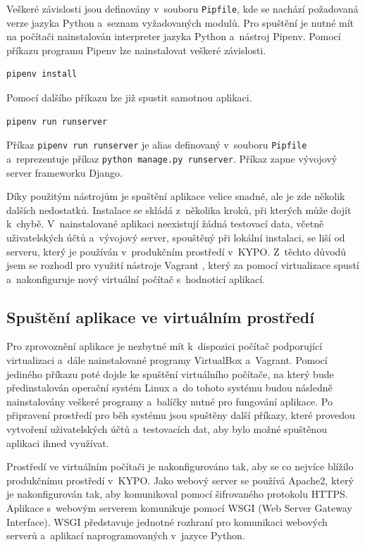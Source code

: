 \documentclass[
  digital,
  twoside,
  table, 
  nolof, 
  nolot
]{fithesis3}
\begin{document}
Veškeré závislosti jsou definovány v~souboru \texttt{Pipfile}, kde se nachází požadovaná verze jazyka Python a~seznam vyžadovaných modulů. Pro spuštění je nutné mít na počítači nainstalován interpreter jazyka Python a~nástroj Pipenv. Pomocí příkazu programu Pipenv lze nainstalovat veškeré závislosti.

\begin{lstlisting}
pipenv install
\end{lstlisting}

\noindent
Pomocí dalšího příkazu lze již spustit samotnou aplikaci.

\begin{lstlisting}
pipenv run runserver
\end{lstlisting}

Příkaz \lstinline[columns=fixed]{pipenv run runserver} je alias definovaný v~souboru \texttt{Pipfile} a~reprezentuje příkaz \lstinline[columns=fixed]{python manage.py runserver}. Příkaz zapne vývojový server frameworku Django.

Díky použitým nástrojům je spuštění aplikace velice snadné, ale je zde několik dalších nedostatků. Instalace se skládá z~několika kroků, při kterých může dojít k~chybě. V~nainstalované aplikaci neexistují žádná testovací data, včetně uživatelských účtů a~vývojový server, spouštěný při lokální instalaci, se liší od serveru, který je používán v~produkčním prostředí v~KYPO. Z~těchto důvodů jsem se rozhodl pro využití nástroje Vagrant \cite{vagrant}, který za pomocí virtualizace spustí a~nakonfiguruje nový virtuální počítač s~hodnoticí aplikací.

\subsection{Spuštění aplikace ve virtuálním prostředí}

Pro zprovoznění aplikace je nezbytné mít k~dispozici počítač podporující virtualizaci a~dále nainstalované programy VirtualBox \cite{virtualbox} a~Vagrant. Pomocí jediného příkazu poté dojde ke spuštění virtuálního počítače, na který bude předinstalován operační systém Linux a~do tohoto systému budou následně nainstalovány veškeré programy a~balíčky nutné pro fungování aplikace. Po připravení prostředí pro běh systému jsou spuštěny další příkazy, které provedou vytvoření uživatelských účtů a~testovacích dat, aby bylo možné spuštěnou aplikaci ihned využívat. 

Prostředí ve virtuálním počítači je nakonfigurováno tak, aby se co nejvíce blížilo produkčnímu prostředí v~KYPO. Jako webový server se používá Apache2, který je nakonfigurován tak, aby komunikoval pomocí šifrovaného protokolu HTTPS. Aplikace s~webovým serverem komunikuje pomocí WSGI (Web Server Gateway Interface). WSGI představuje jednotné rozhraní pro komunikaci webových serverů a~aplikací naprogramovaných v~jazyce Python.
\end{document}
